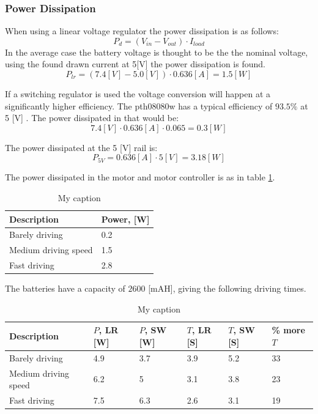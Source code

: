 \subsubsection{Power Dissipation} %
\label{sec:power_dissipation}
When using a linear voltage regulator the power dissipation is as follows:
$$P_d = (V_{in} - V_{out}) \cdot I_{load}$$
In the average case the battery voltage is thought to be the the nominal voltage, using the found drawn current at 5[V] the power dissipation is found.
$$P_{lr} = (7.4 [V] - 5.0 [V]) \cdot 0.636 [A] = 1.5 [W]$$

If a switching regulator is used the voltage conversion will happen at a significantly higher efficiency.
The pth08080w has a typical efficiency of $93.5\%$ at 5 [V] \cite{pth08080}.
The power dissipated in that would be:
$$7.4 [V] \cdot 0.636 [A] \cdot 0.065 = 0.3 [W]$$


The power dissipated at the 5 [V] rail is:
$$P_{5V} = 0.636 [A] \cdot 5 [V] = 3.18 [W]$$

The power dissipated in the motor and motor controller is as in table \ref{tab:power_motor}.

\begin{table}[h]
\centering
\caption{My caption}
\label{tab:power_motor}
\begin{tabular}{|l|l|}
\hline
\textbf{Description} & Power, [W]     \\ \hline
Barely driving       & 0.2 \\ \hline
Medium driving speed & 1.5 \\ \hline
Fast driving         & 2.8 \\ \hline
\end{tabular}
\end{table}

The batteries have a capacity of $2600$ [mAH], giving the following driving times.

\begin{table}[h]
\centering
\caption{My caption}
\label{my-label}
\begin{tabular}{|l|l|p{2cm}|p{2cm}|p{2cm}|p{2cm}|}
\hline
\textbf{Description} & $P$, LR {[}W{]} & $P$, SW {[}W{]} & $T$, LR [S]& $T$, SW [S] & \% more $T$ \\ \hline
Barely driving       & 4.9                         & 3.7                               & 3.9              & 5.2                      & 33                 \\ \hline
Medium driving speed & 6.2                         & 5                                 & 3.1              & 3.8                      & 23                 \\ \hline
Fast driving         & 7.5                         & 6.3                               & 2.6              & 3.1                      & 19                 \\ \hline
\end{tabular}
\end{table}

